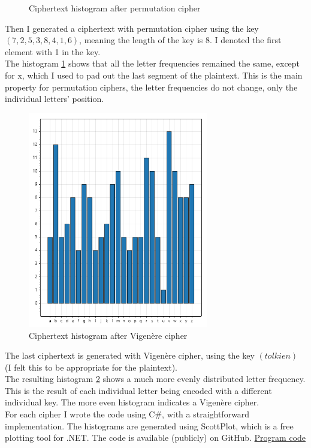 \documentclass{article}
\begin{document}
\begin{enumerate}[label={}]
\begin{figure}[H]
			\caption{Ciphertext histogram after permutation cipher}
			\label{fig:permutedHist}
		\end{figure}
		Then I generated a ciphertext with permutation cipher using the key $(7, 2, 5, 3, 8, 4, 1, 6)$, meaning the length of the key is 8. I denoted the first element with 1 in the key.\\
		The histogram \ref{fig:permutedHist} shows that all the letter frequencies remained the same, except for x, which I used to pad out the last segment of the plaintext. This is the main property for permutation ciphers, the letter frequencies do not change, only the individual letters' position.
		\begin{figure}[H]
			\centering
			\includegraphics[width=0.7\textwidth]{vigenere.png}
			\caption{Ciphertext histogram after Vigenère cipher}
			\label{fig:vigenerelHist}
		\end{figure}
		The last ciphertext is generated with Vigenère cipher, using the key $(tolkien)$ (I felt this to be appropriate for the plaintext).\\
		The resulting histogram \ref{fig:vigenerelHist} shows a much more evenly distributed letter frequency. This is the result of each individual letter being encoded with a different individual key. The more even histogram indicates a Vigenère cipher.\\
		For each cipher I wrote the code using C\#, with a straightforward implementation. The histograms are generated using ScottPlot, which is a free plotting tool for .NET. The code is available (publicly) on GitHub. \hyperlink{https://github.com/halkszavu/Encryption-Homework-2025/blob/main/Code/Homework-Calculations/Homework-Calculations/Program.cs}{Program code}

\end{enumerate}
\end{document}
